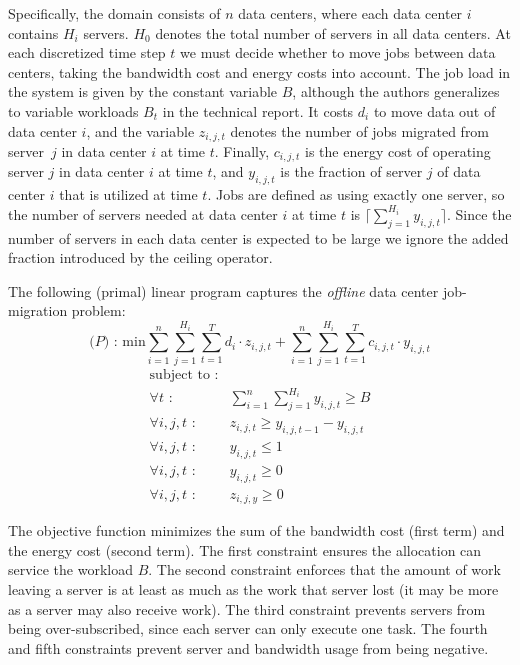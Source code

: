 Specifically, the domain consists of $n$ data centers, where each data center $i$ contains $H_i$ servers.
$H_0$ denotes the total number of servers in all data centers.
At each discretized time step $t$ we must decide whether to move jobs between data centers, taking the bandwidth cost and energy costs into account.
The job load in the system is given by the constant variable $B$, although the authors generalizes to variable workloads $B_{t}$ in the technical report.
It costs $d_i$ to move data out of data center $i$, and the variable $z_{i,j,t}$ denotes the number of jobs migrated from server~$j$ in data center $i$ at time $t$.
Finally, $c_{i,j,t}$ is the energy cost of operating server $j$ in data center $i$ at time $t$, and $y_{i,j,t}$ is the fraction of server $j$ of data center $i$ that is utilized at time $t$.
Jobs are defined as using exactly one server, so the number of servers needed at data center $i$ at time $t$ is $\lceil \sum^{H_i}_{j=1}y_{i,j,t} \rceil$.
Since the number of servers in each data center is expected to be large we ignore the added fraction introduced by the ceiling operator.

The following (primal) linear program captures the \emph{offline} data center job-migration problem:
\[
\textrm{($P$) : min}  \sum^n_{i=1}\sum^{H_i}_{j=1}\sum^{T}_{t=1}d_{i} \cdot z_{i,j,t} + \sum^{n}_{i=1}\sum^{H_{i}}_{j=1}\sum^{T}_{t=1} c_{i,j,t} \cdot y_{i,j,t}
\]
\[
	\begin{array}{rc}
	\textrm{subject to :} & \\
		\forall t \textrm{ :} & \sum^n_{i=1}\sum^{H_i}_{j=1}y_{i,j,t} \geq B \\
		\forall i,j,t \textrm{ :}	    & z_{i,j,t} \geq y_{i,j,t-1} - y_{i,j,t} \\
		\forall i,j,t \textrm{ :}	    & y_{i,j,t} \leq 1 \\
		\forall i,j,t \textrm{ :}	    & y_{i,j,t} \geq 0 \\
		\forall i,j,t \textrm{ :}	    & z_{i,j,y} \geq 0
	\end{array}
\]

The objective function minimizes the sum of the bandwidth cost (first term) and the energy cost (second term).
The first constraint ensures the allocation can service the workload $B$.
The second constraint enforces that the amount of work leaving a server is at least as much as the work that server lost (it may be more as a server may also receive work).
The third constraint prevents servers from being over-subscribed, since each server can only execute one task. 
The fourth and fifth constraints prevent server and bandwidth usage from being negative.

